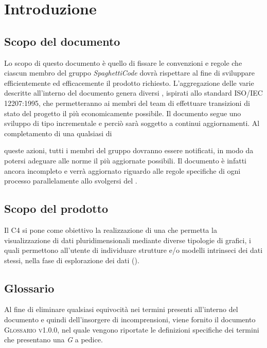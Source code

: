 \section{Introduzione}
\label{sec:introduzione}

\subsection{Scopo del documento}

Lo scopo di questo documento è quello di fissare le convenzioni e regole che ciascun membro del gruppo \emph{SpaghettiCode} dovrà
rispettare al fine di sviluppare efficientemente ed efficacemente il prodotto richiesto. %
L'aggregazione delle varie  descritte all'interno del documento genera diversi , ispirati allo
standard \textsc{ISO/IEC 12207:1995}, che permetteranno ai membri del team di effettuare transizioni di stato del progetto il più
economicamente possibile.
Il documento segue uno sviluppo di tipo incrementale e perciò sarà soggetto a continui aggiornamenti. Al completamento di una qualsiasi di

queste azioni, tutti i membri del gruppo dovranno essere notificati, in modo da potersi adeguare alle norme il più aggiornate possibili. Il
documento è infatti ancora incompleto e verrà aggiornato riguardo alle regole specifiche di ogni processo parallelamente allo svolgersi
del .

\subsection{Scopo del prodotto}

Il  \textsc{C4} si pone come obiettivo la realizzazione di una  che
permetta la visualizzazione di dati pluridimensionali mediante diverse tipologie di grafici, i quali permettono
all'utente di individuare strutture e/o modelli intrinseci dei dati stessi, nella fase di esplorazione dei dati
().

\subsection{Glossario}

Al fine di eliminare qualsiasi equivocità nei termini presenti all'interno del documento e quindi dell'insorgere di incomprensioni, viene
fornito il documento \textsc{Glossario v1.0.0}, nel quale vengono riportate le definizioni specifiche dei termini che presentano una
\emph{G} a pedice.

